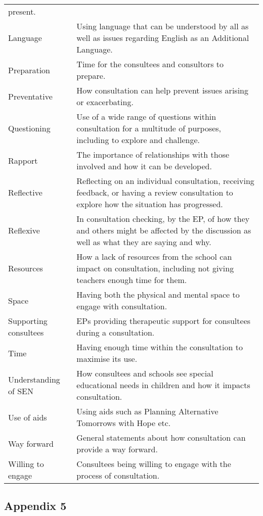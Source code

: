 \documentclass[
  english,
  man]{apa}
\begin{document}
\begin{longtable}[]{@{}
  >{\raggedright\arraybackslash}p{}
  >{\raggedright\arraybackslash}p{}@{}}
present. \\
Language & Using language that can be understood by
all as well as issues regarding English as
an Additional Language. \\
Preparation & Time for the consultees and consultors to
prepare. \\
Preventative & How consultation can help prevent issues
arising or exacerbating. \\
Questioning & Use of a wide range of questions within
consultation for a multitude of purposes,
including to explore and challenge. \\
Rapport & The importance of relationships with those
involved and how it can be developed. \\
Reflective & Reflecting on an individual consultation,
receiving feedback, or having a review
consultation to explore how the situation
has progressed. \\
Reflexive & In consultation checking, by the EP, of how
they and others might be affected by the
discussion as well as what they are saying
and why. \\
Resources & How a lack of resources from the school can
impact on consultation, including not
giving teachers enough time for them. \\
Space & Having both the physical and mental space
to engage with consultation. \\
Supporting consultees & EPs providing therapeutic support for
consultees during a consultation. \\
Time & Having enough time within the consultation
to maximise its use. \\
Understanding of SEN & How consultees and schools see special
educational needs in children and how it
impacts consultation. \\
Use of aids & Using aids such as Planning Alternative
Tomorrows with Hope etc. \\
Way forward & General statements about how consultation
can provide a way forward. \\
Willing to engage & Consultees being willing to engage with the
process of consultation. \\
\bottomrule
\end{longtable}

\hypertarget{appendix-5}{%
\subsection{Appendix 5}\label{appendix-5}}
\end{document}
